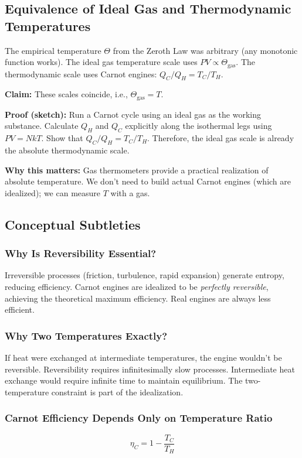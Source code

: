 \documentclass[9pt,twocoloumn]{article}
\begin{document}
\subsection{Equivalence of Ideal Gas and Thermodynamic Temperatures}

The empirical temperature $\Theta$ from the Zeroth Law was arbitrary (any monotonic function works). The ideal gas temperature scale uses $PV \propto \Theta_{\text{gas}}$. The thermodynamic scale uses Carnot engines: $Q_C/Q_H = T_C/T_H$.

\textbf{Claim:} These scales coincide, i.e., $\Theta_{\text{gas}} = T$.

\textbf{Proof (sketch):} Run a Carnot cycle using an ideal gas as the working substance. Calculate $Q_H$ and $Q_C$ explicitly along the isothermal legs using $PV = NkT$. Show that $Q_C/Q_H = T_C/T_H$. Therefore, the ideal gas scale is already the absolute thermodynamic scale.

\textbf{Why this matters:} Gas thermometers provide a practical realization of absolute temperature. We don't need to build actual Carnot engines (which are idealized); we can measure $T$ with a gas.

\subsection{Conceptual Subtleties}

\subsubsection{Why Is Reversibility Essential?}
Irreversible processes (friction, turbulence, rapid expansion) generate entropy, reducing efficiency. Carnot engines are idealized to be \emph{perfectly reversible}, achieving the theoretical maximum efficiency. Real engines are always less efficient.

\subsubsection{Why Two Temperatures Exactly?}
If heat were exchanged at intermediate temperatures, the engine wouldn't be reversible. Reversibility requires infinitesimally slow processes. Intermediate heat exchange would require infinite time to maintain equilibrium. The two-temperature constraint is part of the idealization.

\subsubsection{Carnot Efficiency Depends Only on Temperature Ratio}
\begin{equation}
\eta_C = 1 - \frac{T_C}{T_H}
\end{equation}
\end{document}
